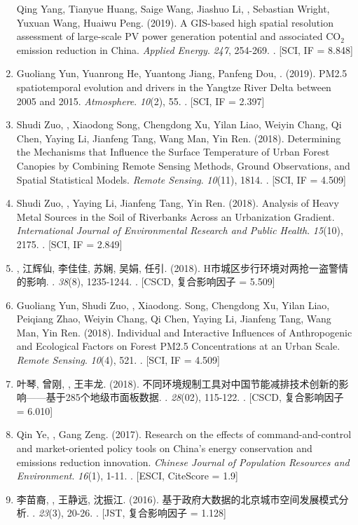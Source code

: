 \begin{enumerate}
    Qing Yang, Tianyue Huang, Saige Wang, Jiashuo Li, \Shaoqing, Sebastian Wright, Yuxuan Wang, Huaiwu Peng. (2019).
    A GIS-based high spatial resolution assessment of large-scale PV power generation potential and associated CO$_2$ emission reduction in China.
    \textit{Applied Energy}. \textit{247}, 254-269.
    . [SCI, IF = 8.848]
\item
    Guoliang Yun, Yuanrong He, Yuantong Jiang, Panfeng Dou, \Shaoqing. (2019).
    PM2.5 spatiotemporal evolution and drivers in the Yangtze River Delta between 2005 and 2015.
    \textit{Atmosphere}. \textit{10}(2), 55.
    . [SCI, IF = 2.397]
\item
    Shudi Zuo, \Shaoqing, Xiaodong Song, Chengdong Xu, Yilan Liao, Weiyin Chang, Qi Chen, Yaying Li, Jianfeng Tang, Wang Man, Yin Ren. (2018).
    Determining the Mechanisms that Influence the Surface Temperature of Urban Forest Canopies by Combining Remote Sensing Methods, Ground Observations, and Spatial Statistical Models. 
    \textit{Remote Sensing}. \textit{10}(11), 1814.
    . [SCI, IF = 4.509]
\item
    Shudi Zuo, \Shaoqing, Yaying Li, Jianfeng Tang, Yin Ren. (2018).
	Analysis of Heavy Metal Sources in the Soil of Riverbanks Across an Urbanization Gradient.
    \textit{International Journal of Environmental Research and Public Health}. \textit{15}(10), 2175.
    . [SCI, IF = 2.849]
\item
    {}, 江辉仙, 李佳佳, 苏娴, 吴娟, 任引. (2018).
	H市城区步行环境对两抢一盗警情的影响.
    {}.  \textit{38}(8), 1235-1244.
    . [CSCD, 复合影响因子 = 5.509]
\item
    Guoliang Yun, Shudi Zuo, \Shaoqing, Xiaodong. Song, Chengdong Xu, Yilan Liao, Peiqiang Zhao, Weiyin Chang, Qi Chen, Yaying Li, Jianfeng Tang, Wang Man, Yin Ren. (2018).
	Individual and Interactive Influences of Anthropogenic and Ecological Factors on Forest PM2.5 Concentrations at an Urban Scale.
    \textit{Remote Sensing}. \textit{10}(4), 521.
    . [SCI, IF = 4.509]
\item
    叶琴, 曾刚, {}, 王丰龙. (2018).
	不同环境规制工具对中国节能减排技术创新的影响——基于285个地级市面板数据.
    {}. \textit{28}(02), 115-122.
    . [CSCD, 复合影响因子 = 6.010]
\item
    Qin Ye, \Shaoqing, Gang Zeng. (2017).
	Research on the effects of command-and-control and market-oriented policy tools on China’s energy conservation and emissions reduction innovation.
    \textit{Chinese Journal of Population Resources and Environment}. \textit{16}(1), 1-11.
    . [ESCI, CiteScore = 1.9]
\item
   李苗裔, {}, 王静远, 沈振江. (2016).
	基于政府大数据的北京城市空间发展模式分析.
    {}. \textit{23}(3), 20-26.
    . [JST, 复合影响因子 = 1.128]
\end{enumerate}

